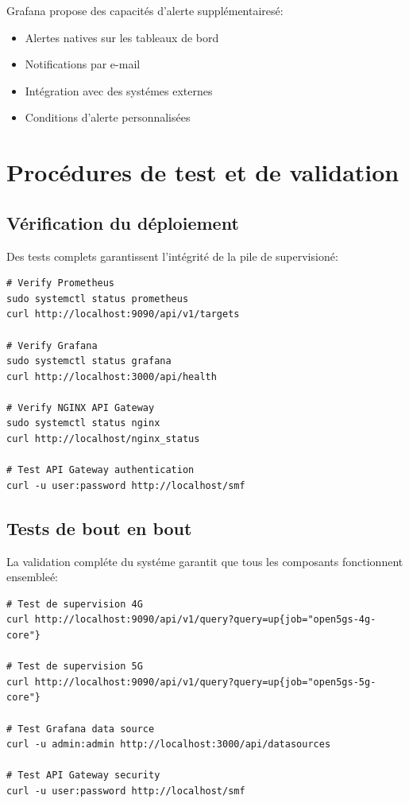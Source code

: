 \documentclass[12pt,a4paper]{report}
\begin{document}
Grafana propose des capacités d'alerte supplémentairesé:

\begin{itemize}
    \item Alertes natives sur les tableaux de bord
    \item Notifications par e-mail
    \item Intégration avec des systémes externes
    \item Conditions d'alerte personnalisées
\end{itemize}

\section{Procédures de test et de validation}

\subsection{Vérification du déploiement}

Des tests complets garantissent l'intégrité de la pile de supervisioné:

\begin{lstlisting}[caption=Monitoring Deployment Verification]
# Verify Prometheus
sudo systemctl status prometheus
curl http://localhost:9090/api/v1/targets

# Verify Grafana
sudo systemctl status grafana
curl http://localhost:3000/api/health

# Verify NGINX API Gateway
sudo systemctl status nginx
curl http://localhost/nginx_status

# Test API Gateway authentication
curl -u user:password http://localhost/smf
\end{lstlisting}

\subsection{Tests de bout en bout}

La validation compléte du systéme garantit que tous les composants fonctionnent ensembleé:

\begin{lstlisting}[caption=Tests de bout en bout]
# Test de supervision 4G
curl http://localhost:9090/api/v1/query?query=up{job="open5gs-4g-core"}

# Test de supervision 5G
curl http://localhost:9090/api/v1/query?query=up{job="open5gs-5g-core"}

# Test Grafana data source
curl -u admin:admin http://localhost:3000/api/datasources

# Test API Gateway security
curl -u user:password http://localhost/smf
\end{lstlisting}
\end{document}
